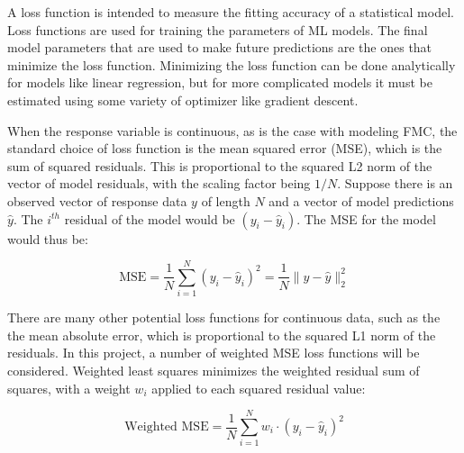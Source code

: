 \documentclass[11pt]{article}%
\begin{document}
A loss function is intended to measure the fitting accuracy of a statistical model. Loss functions are used for training the parameters of ML models. The final model parameters that are used to make future predictions are the ones that minimize the loss function. Minimizing the loss function can be done analytically for models like linear regression, but for more complicated models it must be estimated using some variety of optimizer like gradient descent. 

When the response variable is continuous, as is the case with modeling FMC, the standard choice of loss function is the mean squared error (MSE), which is the sum of squared residuals. This is proportional to the squared L2 norm of the vector of model residuals, with the scaling factor being $1/N$. Suppose there is an observed vector of response data $y$ of length $N$ and a vector of model predictions $\hat y$. The $i^{th}$ residual of the model would be $(y_i - \hat y_i)$. The MSE for the model would thus be:


\begin{equation}
    \label{eq:mse}
    \text{MSE} = \frac{1}{N}\sum_{i=1}^N (y_i - \hat y_i)^2 = \frac{1}{N}\|y - \hat y\|^2_2
\end{equation}

There are many other potential loss functions for continuous data, such as the the mean absolute error, which is proportional to the squared L1 norm of the residuals. In this project, a number of weighted MSE loss functions will be considered. Weighted least squares minimizes the weighted residual sum of squares, with a weight $w_i$ applied to each squared residual value:


\begin{equation}
    \label{eq:wmse}
    \text{Weighted MSE} = \frac{1}{N}\sum_{i=1}^N w_i\cdot (y_i - \hat y_i)^2
\end{equation}
\end{document}
